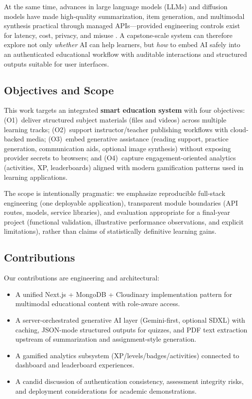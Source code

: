 \documentclass[conference]{IEEEtran}
\begin{document}
At the same time, advances in large language models (LLMs) and diffusion models have made high-quality summarization, item generation, and multimodal synthesis practical through managed APIs---provided engineering controls exist for latency, cost, privacy, and misuse \cite{b2,b3,b6}. A capstone-scale system can therefore explore not only \textit{whether} AI can help learners, but \textit{how} to embed AI safely into an authenticated educational workflow with auditable interactions and structured outputs suitable for user interfaces.

\subsection{Objectives and Scope}

This work targets an integrated \textbf{smart education system} with four objectives: (O1)~deliver structured subject materials (files and videos) across multiple learning tracks; (O2)~support instructor/teacher publishing workflows with cloud-backed media; (O3)~embed generative assistance (reading support, practice generation, communication aids, optional image synthesis) without exposing provider secrets to browsers; and (O4)~capture engagement-oriented analytics (activities, XP, leaderboards) aligned with modern gamification patterns used in learning applications.

The scope is intentionally pragmatic: we emphasize reproducible full-stack engineering (one deployable application), transparent module boundaries (API routes, models, service libraries), and evaluation appropriate for a final-year project (functional validation, illustrative performance observations, and explicit limitations), rather than claims of statistically definitive learning gains.

\subsection{Contributions}

Our contributions are engineering and architectural:
\begin{itemize}
\item A unified Next.js + MongoDB + Cloudinary implementation pattern for multimodal educational content with role-aware access.
\item A server-orchestrated generative AI layer (Gemini-first, optional SDXL) with caching, JSON-mode structured outputs for quizzes, and PDF text extraction upstream of summarization and assignment-style generation.
\item A gamified analytics subsystem (XP/levels/badges/activities) connected to dashboard and leaderboard experiences.
\item A candid discussion of authentication consistency, assessment integrity risks, and deployment considerations for academic demonstrations.
\end{itemize}
\end{document}

